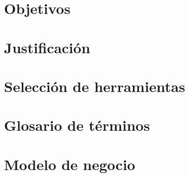 \documentclass[10pt]{book}
\begin{document}
\chapter{Objetivos}\label{chp:objetivos}

\chapter{Justificación}\label{chp:justificacion}

\chapter{Selección de herramientas}\label{chp:seleccionHerramientas}

\chapter{Glosario de términos}\label{chp:glosarioTerminos}


\chapter{Modelo de negocio}\label{chp:modeloNegocios} 


\end{document}
